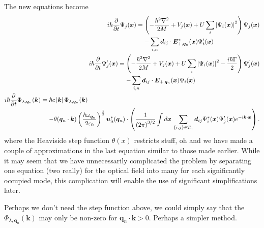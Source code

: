 The new equations become
\begin{subequations}
    \label{OpticalPumping:MeanFieldRWAEvolutionSeparatedOpticalFields}
    \begin{align}
        \begin{split}
            i \hbar \frac{\partial}{\partial t} \Psi_j(\bm{x}) &= \left( -\frac{\hbar^2 \nabla^2}{2M} + V_j(\bm{x}) + U \sum_i \abs{\Psi_i(\bm{x})}^2\right) \Psi_j(\bm{x})\\
            &\relphantom{=} - \sum_{i,n} \bm{d}_{ij} \cdot \bm{E}_{+,\bm{q}_n}^*(\bm{x}) \Psi'_i(\bm{x})
        \end{split}\\
        \begin{split}
            i \hbar \frac{\partial}{\partial t} \Psi'_j(\bm{x}) &= \left( -\frac{\hbar^2 \nabla^2}{2M} + V_j(\bm{x}) + U \sum_i \abs{\Psi_i(\bm{x})}^2 - \frac{i\hbar \Gamma}{2}\right) \Psi'_j(\bm{x})\\
            &\relphantom{=} - \sum_{i,n} \bm{d}_{ij} \cdot \bm{E}_{+,\bm{q}_n}(\bm{x}) \Psi_i(\bm{x}) 
        \end{split}\\
        \begin{split}
            i \hbar \frac{\partial}{\partial t} \Phi_{\lambda, \bm{q}_n}(\bm{k}) &= \hbar c \abs{\bm{k}} \Phi_{\lambda,\bm{q}_n}(\bm{k}) \\
            &\relphantom{=} - \theta(\bm{q}_n \cdot \bm{k}) \left(\frac{\hbar \omega_{\bm{q}_n}}{2 \varepsilon_0}\right)^{\frac{1}{2}} \bm{u}_\lambda^*(\bm{q}_n) \cdot \left( \frac{1}{\left(2\pi\right)^{3/2}} \int d \bm{x}\, \sum_{\{i,j\}\in T_n}\bm{d}_{ij} \Psi^*_i(\bm{x}) \Psi'_j(\bm{x}) e^{-i \bm{k} \cdot \bm{x}} \right).
        \end{split}
    \end{align}
\end{subequations}
where the Heaviside step function $\theta(x)$ restricts stuff, oh and we have made a couple of approximations in the last equation similar to those made earlier.
While it may seem that we have unnecessarily complicated the problem by separating one equation (two really) for the optical field into many for each significantly occupied mode, this complication will enable the use of significant simplifications later.

Perhaps we don't need the step function above, we could simply say that the $\Phi_{\lambda, \bm{q}_n}(\bm{k})$ may only be non-zero for $\bm{q}_n \cdot \bm{k} > 0$.  Perhaps a simpler method.

